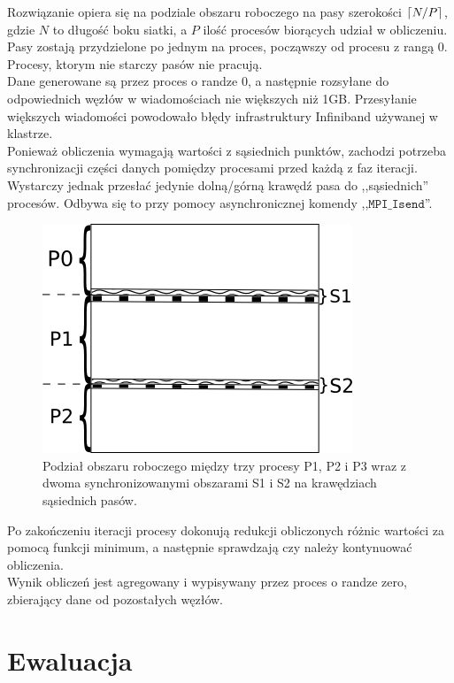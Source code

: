 \documentclass[paper=a4, fontsize=11pt]{scrartcl}	%
\DeclarePairedDelimiter{\ceil}{\lceil}{\rceil}
\numberwithin{equation}{section}		%
\numberwithin{figure}{section}			%
\numberwithin{table}{section}				%
\begin{document}
Rozwiązanie opiera się na podziale obszaru roboczego na pasy szerokości
$\ceil{N / P}$, gdzie $N$ to długość boku siatki, a $P$ ilość procesów biorących
udział w obliczeniu. Pasy zostają przydzielone po jednym na proces, począwszy od
procesu z rangą 0. Procesy, ktorym nie starczy pasów nie pracują.\\

Dane generowane są przez proces o randze 0, a następnie rozsyłane do
odpowiednich węzłów w wiadomościach nie większych niż 1GB. Przesyłanie większych
wiadomości powodowało błędy infrastruktury Infiniband używanej w klastrze.\\

Ponieważ obliczenia wymagają wartości z sąsiednich punktów, zachodzi potrzeba
synchronizacji części danych pomiędzy procesami przed każdą z faz iteracji.
Wystarczy jednak przesłać jedynie dolną/górną krawędź pasa do ,,sąsiednich''
procesów. Odbywa się to przy pomocy asynchronicznej komendy
,,$\texttt{MPI\_Isend}$''.\\

\begin{figure}[h]
  \centering
    \includegraphics{report/podzial.png}
  \caption{Podział obszaru roboczego między trzy procesy P1, P2 i P3 wraz z
           dwoma synchronizowanymi obszarami S1 i S2 na krawędziach sąsiednich
           pasów.}
\end{figure}

Po zakończeniu iteracji procesy dokonują redukcji obliczonych różnic wartości za
pomocą funkcji minimum, a następnie sprawdzają czy należy kontynuować
obliczenia.\\

Wynik obliczeń jest agregowany i wypisywany przez proces o randze zero,
zbierający dane od pozostałych węzłów.



\section{Ewaluacja}
\end{document}
